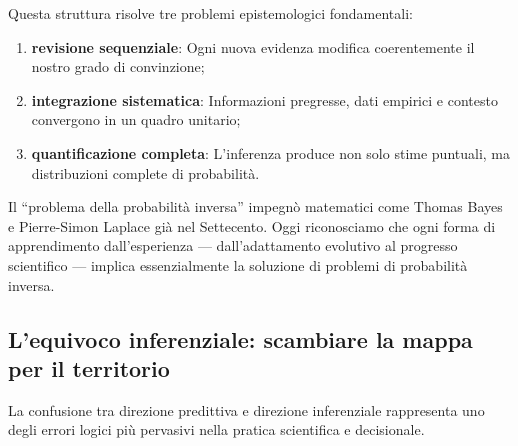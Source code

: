 \documentclass[
  letterpaper,
  DIV=11,
  numbers=noendperiod,
  oneside]{scrreprt}
\providecommand{\tightlist}{%
  \setlength{\itemsep}{0pt}\setlength{\parskip}{0pt}}
\theoremstyle{definition}
\theoremstyle{plain}
\theoremstyle{definition}
\theoremstyle{remark}
\begin{document}
Questa struttura risolve tre problemi epistemologici fondamentali:

\begin{enumerate}
\def\labelenumi{\arabic{enumi}.}
\tightlist
\item
  \textbf{revisione sequenziale}: Ogni nuova evidenza modifica
  coerentemente il nostro grado di convinzione;
\item
  \textbf{integrazione sistematica}: Informazioni pregresse, dati
  empirici e contesto convergono in un quadro unitario;
\item
  \textbf{quantificazione completa}: L'inferenza produce non solo stime
  puntuali, ma distribuzioni complete di probabilità.
\end{enumerate}

\begin{tcolorbox}[enhanced jigsaw, arc=.35mm, breakable, colbacktitle=quarto-callout-note-color!10!white, opacityback=0, toprule=.15mm, rightrule=.15mm, colback=white, opacitybacktitle=0.6, leftrule=.75mm, coltitle=black, bottomtitle=1mm, left=2mm, toptitle=1mm, title=\textcolor{quarto-callout-note-color}{\faInfo}\hspace{0.5em}{Prospettiva storica}, titlerule=0mm, bottomrule=.15mm, colframe=quarto-callout-note-color-frame]

Il ``problema della probabilità inversa'' impegnò matematici come Thomas
Bayes e Pierre-Simon Laplace già nel Settecento. Oggi riconosciamo che
ogni forma di apprendimento dall'esperienza --- dall'adattamento
evolutivo al progresso scientifico --- implica essenzialmente la
soluzione di problemi di probabilità inversa.

\end{tcolorbox}

\subsection{L'equivoco inferenziale: scambiare la mappa per il
territorio}\label{lequivoco-inferenziale-scambiare-la-mappa-per-il-territorio}

La confusione tra direzione predittiva e direzione inferenziale
rappresenta uno degli errori logici più pervasivi nella pratica
scientifica e decisionale.
\end{document}
